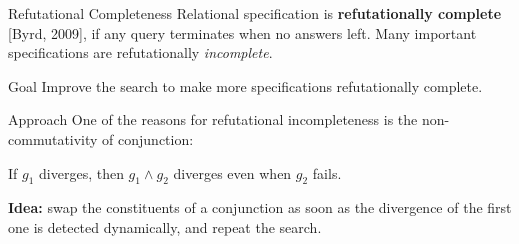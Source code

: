 \documentclass[final,20pt]{beamer}
\begin{document}
\begin{frame}[t]
\begin{columns}[t]
\begin{column}{\onecolwid}
\begin{block}{Refutational Completeness}
      Relational specification is \textbf{refutationally complete} [Byrd, 2009], if any query terminates when 
      no answers left. Many important specifications are refutationally \emph{incomplete}.
      \bigskip
      \end{block}

      \begin{alertblock}{Goal}
        Improve the search to make more specifications refutationally complete.
      \end{alertblock}
   
      \begin{block}{Approach}
      \vskip7mm
      One of the reasons for refutational incompleteness is the non-commutativity of conjunction:

      \begin{figure}
      \end{figure}
      If $g_1$ diverges, then $g_1 \wedge g_2$ diverges even when $g_2$ fails. 
      \bigskip
 
      \textbf{Idea:} swap the constituents of a conjunction as soon as the divergence of the first
      one is detected dynamically, and repeat the search.

      
      
    \end{block}
    
  

\end{column}
\end{columns}
\end{frame}
\end{document}
